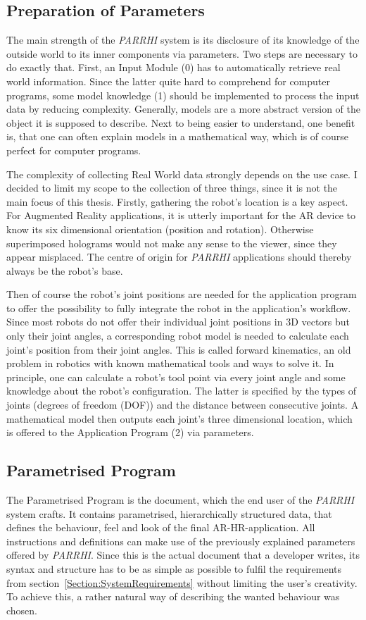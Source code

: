 \subsection{Preparation of Parameters}
The main strength of the \textit{PARRHI} system is its disclosure of its knowledge of the outside world to its inner components via parameters. Two steps are necessary to do exactly that. First, an Input Module (0) has to automatically retrieve real world information. Since the latter quite hard to comprehend for computer programs, some model knowledge (1) should be implemented to process the input data by reducing complexity. Generally, models are a more abstract version of the object it is supposed to describe. Next to being easier to understand, one benefit is, that one can often explain models in a mathematical way, which is of course perfect for computer programs. 

The complexity of collecting Real World data strongly depends on the use case. I decided to limit my scope to the collection of three things, since it is not the main focus of this thesis. Firstly, gathering the robot's location is a key aspect. For Augmented Reality applications, it is utterly important for the AR device to know its six dimensional orientation (position and rotation). Otherwise superimposed holograms would not make any sense to the viewer, since they appear misplaced. The centre of origin for \textit{PARRHI} applications should thereby always be the robot's base. 

Then of course the robot's joint positions are needed for the application program to offer the possibility to fully integrate the robot in the application's workflow. Since most robots do not offer their individual joint positions in 3D vectors but only their joint angles, a corresponding robot model is needed to calculate each joint's position from their joint angles. This is called forward kinematics, an old problem in robotics with known mathematical tools and ways to solve it. In principle, one can calculate a robot's tool point via every joint angle and some knowledge about the robot's configuration. The latter is specified by the types of joints (degrees of freedom (DOF)) and the distance between consecutive joints. A mathematical model then outputs each joint's three dimensional location, which is offered to the Application Program (2) via parameters.

\clearpage
\subsection{Parametrised Program}
\label{Chap:ParametrisedProgram}
The Parametrised Program is the document, which the end user of the \textit{PARRHI} system crafts. It contains parametrised, hierarchically structured data, that defines the behaviour, feel and look of the final AR-HR-application. All instructions and definitions can make use of the previously explained parameters offered by \textit{PARRHI}. Since this is the actual document that a developer writes, its syntax and structure has to be as simple as possible to fulfil the requirements from section~\ref{Section:SystemRequirements} without limiting the user's creativity. To achieve this, a rather natural way of describing the wanted behaviour was chosen. 

